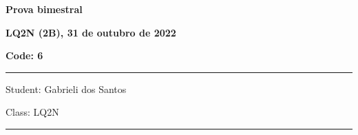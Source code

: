 \documentclass[12pt, addpoints]{exam}
\begin{document}
    \begin{minipage}[b]{0.75\linewidth}
        \begin{flushleft}
            {\bf \large Prova bimestral}
        \end{flushleft}
        \begin{flushleft}
            {\bf \large LQ2N (2B), 31 de outubro de 2022}
        \end{flushleft}
    \end{minipage}
    \begin{minipage}[b]{0.20\linewidth}
        \begin{flushright}
            {\bf \large Code: 6}
        \end{flushright}
    \end{minipage}
    \vspace{0.5cm} \hrule \vspace{0.5cm}
    \begin{minipage}{0.75\linewidth}
        \begin{flushleft}
            Student: Gabrieli dos Santos
        \end{flushleft}
    \end{minipage}
    \begin{minipage}{0.20\linewidth}
        \begin{flushright}
            Class: LQ2N
        \end{flushright}
    \end{minipage}
    \vspace{0.5cm} \hrule \vspace{0.5cm}
\end{document}
